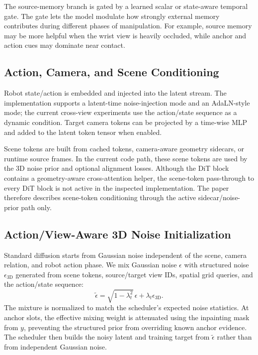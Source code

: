 \documentclass[letterpaper]{article}
\begin{document}
The source-memory branch is gated by a learned scalar or state-aware temporal gate.
The gate lets the model modulate how strongly external memory contributes during different phases of manipulation.
For example, source memory may be more helpful when the wrist view is heavily occluded, while anchor and action cues may dominate near contact.

\subsection{Action, Camera, and Scene Conditioning}

Robot state/action is embedded and injected into the latent stream.
The implementation supports a latent-time noise-injection mode and an AdaLN-style mode; the current cross-view experiments use the action/state sequence as a dynamic condition.
Target camera tokens can be projected by a time-wise MLP and added to the latent token tensor when enabled.

Scene tokens are built from cached tokens, camera-aware geometry sidecars, or runtime source frames.
In the current code path, these scene tokens are used by the 3D noise prior and optional alignment losses.
Although the DiT block contains a geometry-aware cross-attention helper, the scene-token pass-through to every DiT block is not active in the inspected implementation.
The paper therefore describes scene-token conditioning through the active sidecar/noise-prior path only.

\subsection{Action/View-Aware 3D Noise Initialization}

Standard diffusion starts from Gaussian noise independent of the scene, camera relation, and robot action phase.
We mix Gaussian noise $\epsilon$ with structured noise $\epsilon_{\mathrm{3D}}$ generated from scene tokens, source/target view IDs, spatial grid queries, and the action/state sequence:
\[
    \tilde{\epsilon} =
    \sqrt{1-\lambda_t^2}\,\epsilon + \lambda_t \epsilon_{\mathrm{3D}}.
\]
The mixture is normalized to match the scheduler's expected noise statistics.
At anchor slots, the effective mixing weight is attenuated using the inpainting mask from $y$, preventing the structured prior from overriding known anchor evidence.
The scheduler then builds the noisy latent and training target from $\tilde{\epsilon}$ rather than from independent Gaussian noise.
\end{document}
